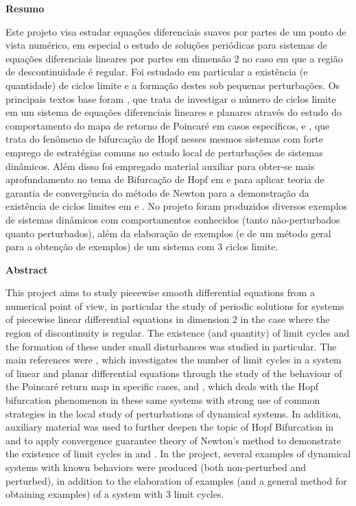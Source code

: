\graphicspath{{images/}}
\centerline{\large \textbf{Resumo}}
\vskip 20mm
Este projeto visa estudar equações diferenciais suaves por partes de um ponto de vista numérico, em especial o estudo de soluções periódicas para sistemas de equações diferenciais lineares por partes em dimensão 2 no caso em que a região de
descontinuidade é regular. Foi estudado em particular a existência (e quantidade) de ciclos limite e a formação destes sob pequenas perturbações. Os principais textos base foram \cite{Huan:etal:2012}, que trata de investigar o número de ciclos limite em um sistema de equações diferenciais lineares e planares através do estudo do comportamento do mapa de retorno de Poincaré em casos específicos, e \cite{HAN20102399}, que trata do fenômeno de bifurcação de Hopf nesses mesmos sistemas com forte emprego de estratégias comuns no estudo local de perturbações de sistemas dinâmicos. Além disso foi empregado material auxiliar para obter-se mais aprofundamento no tema de Bifurcação de Hopf em \cite{Kuznetsov:1998} e para aplicar teoria de garantia de convergência do método de Newton para a demonstração da existência de ciclos limites em \cite{LilPonce2012} e \cite{Tapia1971}. No projeto foram produzidos diversos exemplos de sistemas dinâmicos com comportamentos conhecidos (tanto não-perturbados quanto  perturbados), além da elaboração de exemplos (e de um método geral para a obtenção de exemplos) de um sistema com 3 ciclos limite.

\clearpage
\centerline{\large \textbf{Abstract}}
\vskip 20mm
This project aims to study piecewise smooth differential equations from a numerical point of view, in particular the study of periodic solutions for systems of piecewise linear differential equations in dimension 2 in the case where the region of discontinuity is regular. The existence (and quantity) of limit cycles and the formation of these under small disturbances was studied in particular. The main references were \cite{Huan:etal:2012}, which investigates the number of limit cycles in a system of linear and planar differential equations through the study of the behaviour of the Poincaré return map in specific cases, and \cite{HAN20102399}, which deals with the Hopf bifurcation phenomenon in these same systems with strong use of common strategies in the local study of perturbations of dynamical systems. In addition, auxiliary material was used to further deepen the topic of Hopf Bifurcation in \cite{Kuznetsov:1998} and to apply convergence guarantee theory of Newton's method to demonstrate the existence of limit cycles in \cite{LilPonce2012} and \cite{Tapia1971}. In the project, several examples of dynamical systems with known behaviors were produced (both non-perturbed and perturbed), in addition to the elaboration of examples (and a general method for obtaining examples) of a system with 3 limit cycles.

